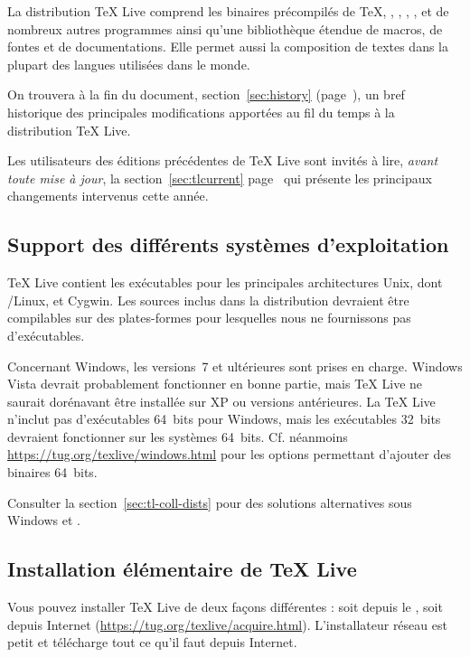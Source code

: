 \documentclass[german, english, french]{article}
\renewcommand{\TL}{\TeX{} Live\xspace}%
\begin{document}
La distribution \TL{} comprend les binaires précompilés de \TeX, \LaTeXe,
\ConTeXt, \MF, \MP, \BibTeX{} et de nombreux autres programmes ainsi qu'une
bibliothèque étendue de macros, de fontes et de documentations. Elle permet
aussi la composition de textes dans la plupart des langues utilisées dans le
monde.

On trouvera à la fin du document, section~\ref{sec:history}
(page~\pageref{sec:history}), un bref historique des principales modifications
apportées au fil du temps à la distribution \TL{}.

Les utilisateurs des éditions précédentes de \TL{} sont invités à lire,
\emph{avant toute mise à jour}, la section~\ref{sec:tlcurrent}
page~\pageref{sec:tlcurrent} qui présente les principaux changements intervenus
cette année.

\subsection{Support des différents systèmes d'exploitation}
\label{sec:os-support}

\TL{} contient les exécutables pour les principales architectures Unix, dont
\GNU/Linux, \MacOSX et Cygwin. Les sources inclus dans la distribution devraient
être compilables sur des plates-formes pour lesquelles nous ne fournissons pas
d'exécutables.

Concernant Windows, les versions~7 et ultérieures sont prises en charge.
Windows Vista devrait probablement fonctionner en bonne partie, mais \TL{} ne
saurait dorénavant être installée sur XP ou versions antérieures.  La \TL{}
n'inclut pas d'exécutables 64~bits pour Windows, mais les exécutables 32~bits
devraient fonctionner sur les systèmes 64~bits. Cf. néanmoins
\url{https://tug.org/texlive/windows.html} pour les options permettant d'ajouter
des binaires 64~bits.

Consulter la section~\ref{sec:tl-coll-dists} pour des solutions alternatives
sous Windows et \MacOSX.

\subsection{Installation élémentaire de \protect\TL{}}
\label{sec:basic}

Vous pouvez installer \TL{} de deux façons différentes : soit depuis le \DVD,
soit depuis Internet (\url{https://tug.org/texlive/acquire.html}).
L'installateur réseau est petit et télécharge tout ce qu'il faut depuis
Internet.
\end{document}
